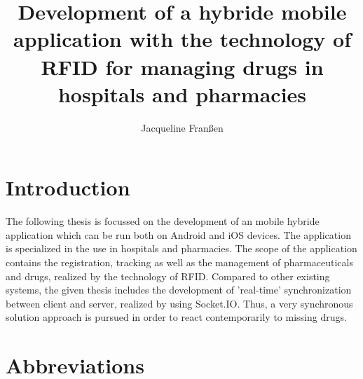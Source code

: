 \documentclass[12pt,a4paper]{book}
\author{Jacqueline Franßen}
\title{Development of a hybride mobile application with the technology of RFID for managing drugs in hospitals and pharmacies}
\newcommand\BackgroundPic{
\put(70,-40){
\parbox[b][\paperheight]{\paperwidth}{%
\texttt{[image: marca\_agua]}%
}}}
\begin{document}
\pagestyle{bloque_inicial} %


\cleardoublepage
\cleardoublepage
\tableofcontents
\cleardoublepage
{}
\listoffigures
\cleardoublepage
{}
\listoftables


\newpage{} %
\pagestyle{doc_body} %

\chapter{\textbf{Introduction}}
The following thesis is focussed on the development of an mobile hybride application which can be run both on Android and iOS devices. The application is specialized in the use in hospitals and pharmacies. The scope of the application contains the registration, tracking as well as the management of pharmaceuticals and drugs, realized by the technology of RFID. Compared to other existing systems, the given thesis includes the development of 'real-time' synchronization between client and server, realized by using Socket.IO. Thus, a very synchronous solution approach is pursued in order to react contemporarily to missing drugs.






\cleardoublepage

\thispagestyle{fancy}
\printbibliography
\let\cleardoublepage\clearpage
\clearpage

\ClearShipoutPicture


\appendix
\thispagestyle{fancy} %
\chapter{\textbf{Abbreviations}}

\end{document}
